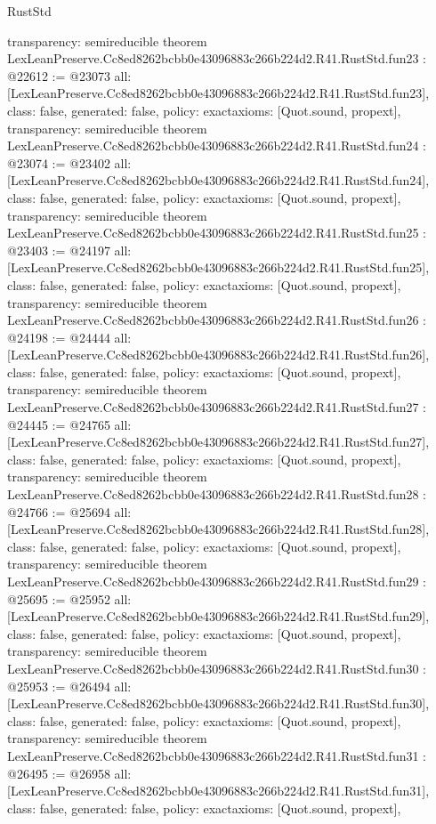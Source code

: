 \begin{lexlean}{RustStd}
\begin{coremodule}
{  transparency: semireducible
}
theorem LexLeanPreserve.Cc8ed8262bcbb0e43096883c266b224d2.R41.RustStd.fun23 : @22612 := @23073 {
  all: [LexLeanPreserve.Cc8ed8262bcbb0e43096883c266b224d2.R41.RustStd.fun23],
  class: false,
  generated: false,
  policy: exact{axioms: [Quot.sound, propext]},
  transparency: semireducible
}
theorem LexLeanPreserve.Cc8ed8262bcbb0e43096883c266b224d2.R41.RustStd.fun24 : @23074 := @23402 {
  all: [LexLeanPreserve.Cc8ed8262bcbb0e43096883c266b224d2.R41.RustStd.fun24],
  class: false,
  generated: false,
  policy: exact{axioms: [Quot.sound, propext]},
  transparency: semireducible
}
theorem LexLeanPreserve.Cc8ed8262bcbb0e43096883c266b224d2.R41.RustStd.fun25 : @23403 := @24197 {
  all: [LexLeanPreserve.Cc8ed8262bcbb0e43096883c266b224d2.R41.RustStd.fun25],
  class: false,
  generated: false,
  policy: exact{axioms: [Quot.sound, propext]},
  transparency: semireducible
}
theorem LexLeanPreserve.Cc8ed8262bcbb0e43096883c266b224d2.R41.RustStd.fun26 : @24198 := @24444 {
  all: [LexLeanPreserve.Cc8ed8262bcbb0e43096883c266b224d2.R41.RustStd.fun26],
  class: false,
  generated: false,
  policy: exact{axioms: [Quot.sound, propext]},
  transparency: semireducible
}
theorem LexLeanPreserve.Cc8ed8262bcbb0e43096883c266b224d2.R41.RustStd.fun27 : @24445 := @24765 {
  all: [LexLeanPreserve.Cc8ed8262bcbb0e43096883c266b224d2.R41.RustStd.fun27],
  class: false,
  generated: false,
  policy: exact{axioms: [Quot.sound, propext]},
  transparency: semireducible
}
theorem LexLeanPreserve.Cc8ed8262bcbb0e43096883c266b224d2.R41.RustStd.fun28 : @24766 := @25694 {
  all: [LexLeanPreserve.Cc8ed8262bcbb0e43096883c266b224d2.R41.RustStd.fun28],
  class: false,
  generated: false,
  policy: exact{axioms: [Quot.sound, propext]},
  transparency: semireducible
}
theorem LexLeanPreserve.Cc8ed8262bcbb0e43096883c266b224d2.R41.RustStd.fun29 : @25695 := @25952 {
  all: [LexLeanPreserve.Cc8ed8262bcbb0e43096883c266b224d2.R41.RustStd.fun29],
  class: false,
  generated: false,
  policy: exact{axioms: [Quot.sound, propext]},
  transparency: semireducible
}
theorem LexLeanPreserve.Cc8ed8262bcbb0e43096883c266b224d2.R41.RustStd.fun30 : @25953 := @26494 {
  all: [LexLeanPreserve.Cc8ed8262bcbb0e43096883c266b224d2.R41.RustStd.fun30],
  class: false,
  generated: false,
  policy: exact{axioms: [Quot.sound, propext]},
  transparency: semireducible
}
theorem LexLeanPreserve.Cc8ed8262bcbb0e43096883c266b224d2.R41.RustStd.fun31 : @26495 := @26958 {
  all: [LexLeanPreserve.Cc8ed8262bcbb0e43096883c266b224d2.R41.RustStd.fun31],
  class: false,
  generated: false,
  policy: exact{axioms: [Quot.sound, propext]},
}
\end{coremodule}
\end{lexlean}
